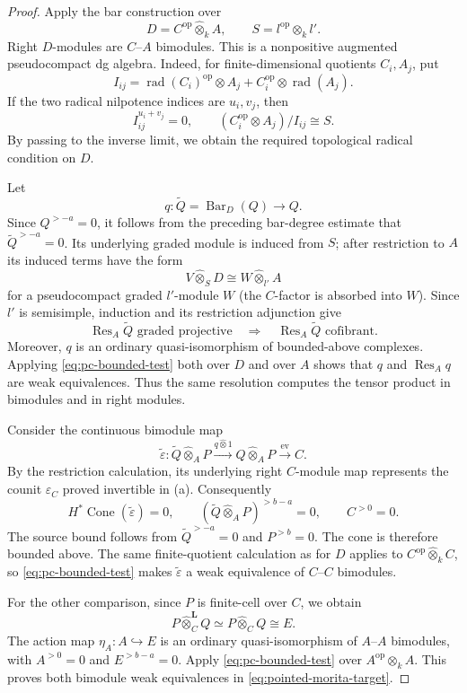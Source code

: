 \documentclass[12pt,a4paper,english,reqno]{amsart}
\theoremstyle{plain}
\theoremstyle{definition}
\numberwithin{equation}{section}
\def\rad{\operatorname{rad}}
\def\ox{\otimes}
\begin{document}
\begin{proof}
Apply the bar construction over
\[
 D=C^{\mathrm{op}}\widehat\ox_k A,
 \qquad S=l^{\mathrm{op}}\ox_k l'.
\]
Right $D$-modules are $C$--$A$ bimodules. This is a nonpositive
augmented pseudocompact dg algebra. Indeed, for finite-dimensional
quotients $C_i,A_j$, put
\[
 I_{ij}=\rad(C_i)^{\mathrm{op}}\ox A_j
       +C_i^{\mathrm{op}}\ox\rad(A_j).
\]
If the two radical nilpotence indices are $u_i,v_j$, then
\[
 I_{ij}^{u_i+v_j}=0,\qquad
 (C_i^{\mathrm{op}}\ox A_j)/I_{ij}\cong S.
\]
By passing to the inverse limit, we obtain the required topological radical
condition on $D$.

Let
\[
 q:\widetilde Q=\operatorname{Bar}_D(Q)\longrightarrow Q.
\]
Since $Q^{>-a}=0$, it follows from the preceding bar-degree estimate that
$\widetilde Q^{>-a}=0$. Its underlying graded module is induced
from $S$; after restriction to $A$ its induced terms have the form
\[
 V\widehat\ox_S D
 \cong W\widehat\ox_{l'} A
\]
for a pseudocompact graded $l'$-module $W$ (the $C$-factor is
absorbed into $W$). Since $l'$ is semisimple, induction and its
restriction adjunction give
\[
 \operatorname{Res}_A\widetilde Q
 \text{ graded projective}
 \quad\Longrightarrow\quad
 \operatorname{Res}_A\widetilde Q\text{ cofibrant}.
\]
Moreover, $q$ is an ordinary quasi-isomorphism of bounded-above
complexes. Applying \eqref{eq:pc-bounded-test} both over $D$ and
over $A$ shows that $q$ and $\operatorname{Res}_Aq$ are weak
equivalences. Thus the same resolution computes the tensor product
in bimodules and in right modules.

Consider the continuous bimodule map
\[
 \widetilde\varepsilon:
 \widetilde Q\widehat\ox_A P
 \xrightarrow{q\widehat\ox 1}Q\widehat\ox_A P
 \xrightarrow{\mathrm{ev}}C.
\]
By the restriction calculation, its underlying right $C$-module
map represents the counit $\varepsilon_C$ proved invertible in (a).
Consequently
\[
 H^*\operatorname{Cone}(\widetilde\varepsilon)=0,
 \qquad
 (\widetilde Q\widehat\ox_A P)^{>b-a}=0,
 \qquad C^{>0}=0.
\]
The source bound follows from
$\widetilde Q^{>-a}=0$ and $P^{>b}=0$. The cone is therefore
bounded above. The same finite-quotient calculation as for $D$
applies to $C^{\mathrm{op}}\widehat\ox_k C$, so
\eqref{eq:pc-bounded-test} makes $\widetilde\varepsilon$ a weak
equivalence of $C$--$C$ bimodules.

For the other comparison, since $P$ is finite-cell over $C$, we obtain
\[
 P\widehat\ox_C^{\mathbf L}Q
 \simeq P\widehat\ox_CQ\cong E.
\]
The action map $\eta_A:A\hookrightarrow E$ is an ordinary
quasi-isomorphism of $A$--$A$ bimodules, with
$A^{>0}=0$ and $E^{>b-a}=0$. Apply
\eqref{eq:pc-bounded-test} over
$A^{\mathrm{op}}\widehat\ox_k A$. This proves both bimodule
weak equivalences in \eqref{eq:pointed-morita-target}.


\end{proof}
\end{document}
